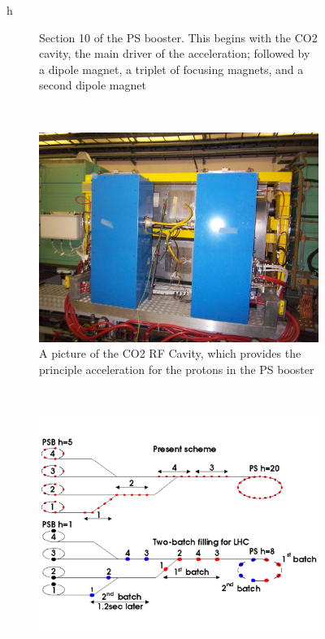 \begin{figure}{h}
\begin{subfigure}[h]{0.4\textwidth}
        \caption{Section 10 of the PS booster.  This begins with the
          CO2 cavity, the main driver of the acceleration; followed by
        a dipole magnet, a triplet of focusing magnets, and a second
        dipole magnet \cite{LHC:LHC_psbooster_section10_layout_image}}\label{fig:psbooster_section10}
      \end{subfigure}
      ~ %
      \begin{subfigure}[h]{0.4\textwidth}
        \includegraphics[width=\textwidth]{Figures/LHC_Diagrams/LHC__PSbooster__CO2_RFCavity__P10L1.JPG}
        \caption{A picture of the CO2 RF Cavity, which provides the
          principle acceleration for the protons in the PS booster \cite{LHC:LHC_psbooster_CO2_RF_Cavity_image}}\label{fig:psbooster_CO2_RFCavity}
      \end{subfigure}
      ~ %
      \begin{subfigure}[h]{0.4\textwidth}
        \includegraphics[width=\textwidth]{Figures/LHC_Diagrams/LHC__PSbooster__2batchFillingScheme__schindlrf.pdf}

\end{subfigure}
\end{figure}
